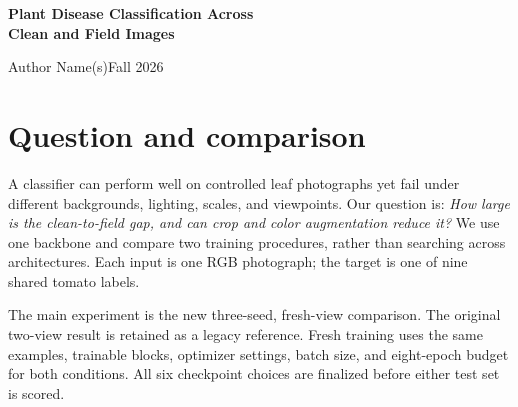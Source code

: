\documentclass[11pt,letterpaper]{article}
\begin{document}
\begin{center}
{\Large\bfseries Plant Disease Classification Across\\Clean and Field Images}\par
\vspace{.5em}Author Name(s)\quad Fall 2026
\end{center}
\begin{abstract}
We test whether stronger crop and color augmentation improves transfer from controlled tomato-leaf photographs to field images. Building on a supplied single-seed experiment with two fixed views per image, we independently train six ImageNet-pretrained MobileNetV3-Small classifiers: ordinary and strong augmentation under three paired seeds, with fresh views sampled every epoch. The official source split and all training budgets remain fixed; checkpoint selection uses only PlantVillage validation. Ordinary training reaches $\FreshOrdCleanAcc\pm\FreshOrdCleanAccSD$\% clean accuracy and $\FreshOrdFieldAcc\pm\FreshOrdFieldAccSD$\% field accuracy. Strong augmentation reaches $\FreshAugCleanAcc\pm\FreshAugCleanAccSD$\% and $\FreshAugFieldAcc\pm\FreshAugFieldAccSD$\%, respectively (mean $\pm$ sample SD over seeds). The mean paired field changes are $\FreshDeltaAcc$ percentage points in accuracy and $\FreshDeltaFone$ in macro-F1. \FreshConclusion\ Training logs, all six checkpoints, individual predictions, independent metric audits, and an executed Notebook accompany the report.
\end{abstract}

\section{Question and comparison}
A classifier can perform well on controlled leaf photographs yet fail under different backgrounds, lighting, scales, and viewpoints. Our question is: \emph{How large is the clean-to-field gap, and can crop and color augmentation reduce it?} We use one backbone and compare two training procedures, rather than searching across architectures. Each input is one RGB photograph; the target is one of nine shared tomato labels.

The main experiment is the new three-seed, fresh-view comparison. The original two-view result is retained as a legacy reference. Fresh training uses the same examples, trainable blocks, optimizer settings, batch size, and eight-epoch budget for both conditions. All six checkpoint choices are finalized before either test set is scored.
\end{document}
